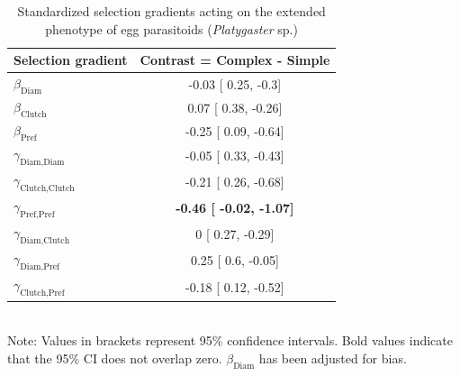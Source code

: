 \documentclass[11pt,]{article}
\begin{document}
\bigskip

\begin{table}[h]
\caption{Standardized selection gradients acting on the extended phenotype of egg parasitoids (\textit{Platygaster} sp.)}
\label{Table:ExtendedGradients}
\centering
\begin{tabular}{lc}
\\ 
\hline
\textbf{Selection gradient} & \textbf{Contrast = Complex - Simple}  \\ 
\hline
$\beta_{\text{Diam}}$ & 

-0.03 [
0.25,
-0.3] \\

$\beta_{\text{Clutch}}$ & 

0.07 [
0.38,
-0.26] \\

$\beta_{\text{Pref}}$ &

-0.25 [
0.09,
-0.64] \\

$\gamma_{\text{Diam,Diam}}$ &

-0.05 [
0.33,
-0.43] \\

$\gamma_{\text{Clutch,Clutch}}$ & 

-0.21 [
0.26,
-0.68] \\

$\gamma_{\text{Pref,Pref}}$ & 

\textbf{
-0.46 [
-0.02,
-1.07] }\\

$\gamma_{\text{Diam,Clutch}}$ & 

0 [
0.27,
-0.29] \\

$\gamma_{\text{Diam,Pref}}$ & 

0.25 [
0.6,
-0.05] \\

$\gamma_{\text{Clutch,Pref}}$ & 

-0.18 [
0.12,
-0.52] \\ 
\hline
\end{tabular}
\bigskip{}
\\
{\footnotesize Note: Values in brackets represent 95\% confidence intervals. Bold values indicate that the 95\% CI does not overlap zero. $\beta_{\text{Diam}}$ has been adjusted for bias.}
\end{table}
\end{document}
